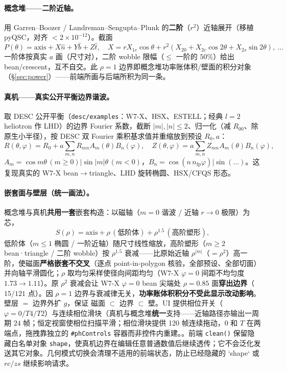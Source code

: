 \documentclass[UTF8,11pt]{ctexart}
\begin{document}
\paragraph{概念堆——二阶近轴。}
用 Garren–Boozer / Landreman–Sengupta–Plunk 的\textbf{二阶}（$r^2$）近轴展开（移植 pyQSC，对齐 $<2\times10^{-12}$）。截面
\[
P(\theta)=\text{axis}+X\hat n+Y\hat b+Z\hat t,\quad
X=rX_{1c}\cos\theta+r^2(X_{20}+X_{2c}\cos2\theta+X_{2s}\sin2\theta),\ \dots
\]
一阶体按真实 $a$ 画（尺寸对），二阶 wobble 限幅（$\le$ 一阶的 $50\%$）给出 bean/crescent，互不自交。此 $\rho{=}1$ 边界即概念堆功率账体积/壁面的积分对象（\S\ref{sec:power}）——前端所画与后端所积为同一条。

\paragraph{真机——真实公开平衡边界谐波。}
取 DESC 公开平衡（\texttt{desc/examples}：W7-X、HSX、ESTELL；经典 $l{=}2$ heliotron 作 LHD）的边界 Fourier 系数，截断 $|m|,|n|\le2$、归一化（减 $R_{00}$、除原生小半径），按 DESC 双 Fourier 乘积基求值并重缩放到预设 $R_0,a$：
\begin{equation}
R(\theta,\varphi)=R_0+a\!\sum_{m,n}\!R_{mn}A_m(\theta)B_n(\varphi),\quad
Z(\theta,\varphi)=a\!\sum_{m,n}\!Z_{mn}A_m(\theta)B_n(\varphi),
\end{equation}
$A_m=\cos m\theta\,(m\!\ge\!0)|\sin|m|\theta\,(m\!<\!0)$，$B_n=\cos(n\,n_\mathrm{fp}\varphi)|\sin(\dots)$。这复现真实的 W7-X bean$\to$triangle、LHD 旋转椭圆、HSX/CFQS 形态。

\paragraph{嵌套面与壁层（统一画法）。}
概念堆与真机\textbf{共用一套}嵌套构造：以磁轴（$m{=}0$ 谐波 / 近轴 $r\!\to\!0$ 极限）为芯，
\[
S(\rho)=\text{axis}+\rho\,(\text{低阶体})+\rho^{1.5}\,(\text{高阶塑形}),
\]
低阶体（$m\!\le\!1$ 椭圆 / 一阶近轴）随尺寸线性缩放，高阶塑形（$m\!\ge\!2$ bean·triangle / 二阶 wobble）按 $\rho^{1.5}$ 衰减——比原始近轴 $\rho^{|m|}$（$=\rho^2$）高一阶，使磁面\textbf{严格嵌套不交叉}（逐点 point-in-polygon 核验，全部预设、全部切面）并向轴平滑圆化；$\rho$ 取均匀采样使径向间距均匀（W7-X $\varphi{=}0$ 间距不均匀度 $1.73\!\to\!1.11$）。原 $\rho^2$ 衰减会让 W7-X $\varphi{=}0$ bean 尖端处 $\rho{=}0.85$ 面\textbf{穿出边界}（$15/121$ 点）。因 $\rho{=}1$ 边界与衰减律无关，\textbf{功率账体积积分不受此显示改动影响}。壁层 $=$ 边界外扩 $g$，保证 磁面 $\subset$ 边界 $\subset$ 壁。UI 提供相位开关（$\varphi=0/T4/T2$）与连续相位滑块（真机与概念堆\textbf{统一}支持——近轴路径亦输出一周期 $24$ 帧；恒定视窗使相位扫描平滑；相位滑块提供 120 帧连续拖动，$0$ 和 $T$ 在两端点，拖拽靠独立的 \texttt{\#phControls} 容器而非控件内重建。。前端 \texttt{clean()} 保留隐藏白名单对象 \texttt{shape}，使真机边界在编辑任意普通数值后继续透传；它不会泛化发送其它对象。几何模式切换会清理不适用的前端状态，防止已经隐藏的 `shape` 或 $rc/zs$ 继续影响请求。
\end{document}
